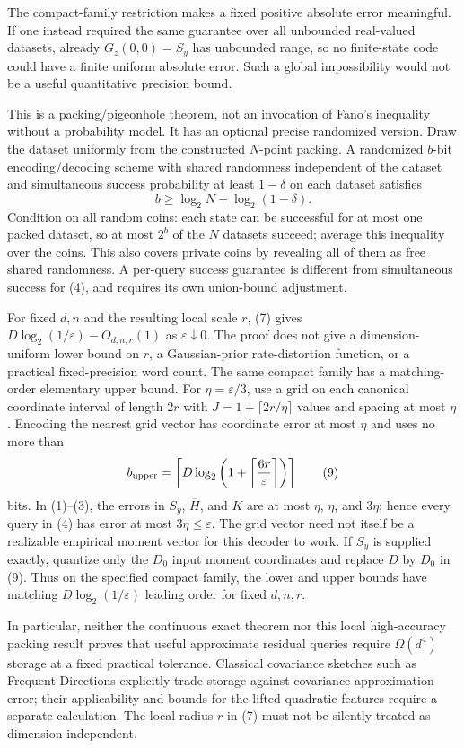 \documentclass[11pt]{article}
\begin{document}
The compact-family restriction makes a fixed positive absolute error
meaningful. If one instead required the same guarantee over all
unbounded real-valued datasets, already $G_z(0,0)=S_y$ has unbounded
range, so no finite-state code could have a finite uniform absolute
error. Such a global impossibility would not be a useful quantitative
precision bound.

This is a packing/pigeonhole theorem, not an invocation of Fano's
inequality without a probability model. It has an optional precise
randomized version. Draw the dataset uniformly from the constructed
$N$-point packing. A randomized $b$-bit encoding/decoding scheme with
shared randomness independent of the dataset and simultaneous
success probability at least $1-\delta$ on each dataset satisfies
\[
 b\ge\log_2N+\log_2(1-\delta).\tag{8}
\]
Condition on all random coins: each state can be successful for at
most one packed dataset, so at most $2^b$ of the $N$ datasets
succeed; average this inequality over the coins. This also covers
private coins by revealing all of them as free shared randomness.
A per-query success guarantee is different from simultaneous
success for (4), and requires its own union-bound adjustment.

For fixed $d,n$ and the resulting local scale $r$, (7) gives
$D\log_2(1/\varepsilon)-O_{d,n,r}(1)$ as $\varepsilon\downarrow0$.
The proof does not give a dimension-uniform lower bound on $r$, a
Gaussian-prior rate-distortion function, or a practical fixed-precision
word count. The same compact family has a matching-order elementary
upper bound. For $\eta=\varepsilon/3$, use a grid on each canonical
coordinate interval of length $2r$ with
$J=1+\lceil2r/\eta\rceil$ values and spacing at most $\eta$.
Encoding the nearest grid vector has coordinate error at most $\eta$
and uses no more than
\[
 b_{\rm upper}=\left\lceil D\log_2\left(
                   1+\left\lceil\frac{6r}{\varepsilon}\right\rceil
                              \right)\right\rceil
 \tag{9}
\]
bits. In (1)--(3), the errors in $S_y$, $\overline H$, and $K$ are
at most $\eta$, $\eta$, and $3\eta$; hence every query in (4) has
error at most $3\eta\le\varepsilon$. The grid vector need not
itself be a realizable empirical moment vector for this decoder to
work. If $S_y$ is supplied exactly, quantize only the $D_0$ input
moment coordinates and replace $D$ by $D_0$ in (9). Thus on the
specified compact family, the lower and upper bounds have matching
$D\log_2(1/\varepsilon)$ leading order for fixed $d,n,r$.

In particular, neither the continuous exact theorem nor this local
high-accuracy packing result proves that useful approximate residual
queries require $\Omega(d^4)$ storage at a fixed practical tolerance.
Classical covariance sketches such as Frequent Directions explicitly
trade storage against covariance approximation error\cite{fd}; their
applicability and bounds for the lifted quadratic features require a
separate calculation. The local radius $r$ in (7) must not be silently
treated as dimension independent.
\end{document}
